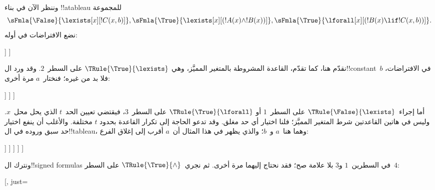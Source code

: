 \documentclass[../../../include/open-logic-section]{subfiles}
\begin{document}
\begin{ex}
وننظر الآن في بناء !!a{tableau} للمجموعة
\[
\sFmla{\False}{\lexists[x][!C(x,b)]},
\sFmla{\True}{\lexists[x][(!A(x) \land !B(x))]},
\sFmla{\True}{\lforall[x][(!B(x) \lif !C(x,b))]}.
\]
نضع الافتراضات في أوله:
\begin{oltableau}
  [\sFmla{\False}{\lexists[x][\formula{C}(x,b)]}, just=\TAss
    [\sFmla{\True}{\lexists[x][(\formula{A}(x) \land \formula{B}(x))]},
      just=\TAss
      [\sFmla{\True}{\lforall[x][(\formula{B}(x) \lif \formula{C}(x,b))]},
        just=\TAss]
    ]
  ]
\end{oltableau}
نقدّم هنا، كما تقدّم، القاعدة المشروطة بالمتغير المميَّز، وهي
$\TRule{\True}{\lexists}$ على السطر~$2$.
وقد ورد ال!!{constant}~$b$ في الافتراضات، فلا بد من غيره؛
فنختار~$a$ مرة أخرى:
\begin{oltableau}
  [\sFmla{\False}{\lexists[x][\formula{C}(x,b)]}, just=\TAss
    [\sFmla{\True}{\lexists[x][(\formula{A}(x) \land \formula{B}(x))]},
      just=\TAss, checked
      [\sFmla{\True}{\lforall[x][(\formula{B}(x) \lif \formula{C}(x,b))]},
        just=\TAss
        [\sFmla{\True}{\formula{A}(a) \land \formula{B}(a)},
          just={\TRule{\True}{\lexists}[2]}]
      ]
    ]
  ]
\end{oltableau}
أما إجراء~$\TRule{\False}{\lexists}$ على السطر~$1$ أو
$\TRule{\True}{\lforall}$ على السطر~$3$، فيقتضي تعيين الحد~$t$
الذي يحل محل~$x$. وليس في هاتين القاعدتين شرط المتغير المميَّز؛
فلنا اختيار أي حد مغلق. وقد تدعو الحاجة إلى تكرار القاعدة بحدود
$t$ مختلفة. والأغلب أن ينفع اختيار حد سبق وروده في ال!!{tableau}،
وهما هنا~$a$ و~$b$؛ والذي يظهر في هذا المثال أن~$a$ أقرب إلى
إغلاق الفرع:
\begin{oltableau}
  [\sFmla{\False}{\lexists[x][\formula{C}(x,b)]}, just=\TAss
    [\sFmla{\True}{\lexists[x][(\formula{A}(x) \land \formula{B}(x))]},
      just=\TAss, checked
      [\sFmla{\True}{\lforall[x][(\formula{B}(x) \lif \formula{C}(x,b))]}, just=\TAss
        [\sFmla{\True}{\formula{A}(a) \land \formula{B}(a)}, just={\TRule{\True}{\lexists}[2]}
          [\sFmla{\False}{\formula{C}(a,b)}, just={\TRule{\False}{\lexists}[1]}
            [\sFmla{\True}{\formula{B}(a) \lif \formula{C}(a,b)},
              just={\TRule{\True}{\lforall}[3]}
            ]
          ]
        ]
      ]
    ]
  ]
\end{oltableau}
ونترك ال!!{signed formula}s في السطرين~$1$ و$3$ بلا علامة صح؛
فقد نحتاج إليهما مرة أخرى. ثم نجري~$\TRule{\True}{\land}$
على السطر~$4$:
\begin{oltableau}
  [\sFmla{\False}{\lexists[x][\formula{C}(x,b)]}, just=\TAss

\end{oltableau}
\end{ex}
\end{document}
